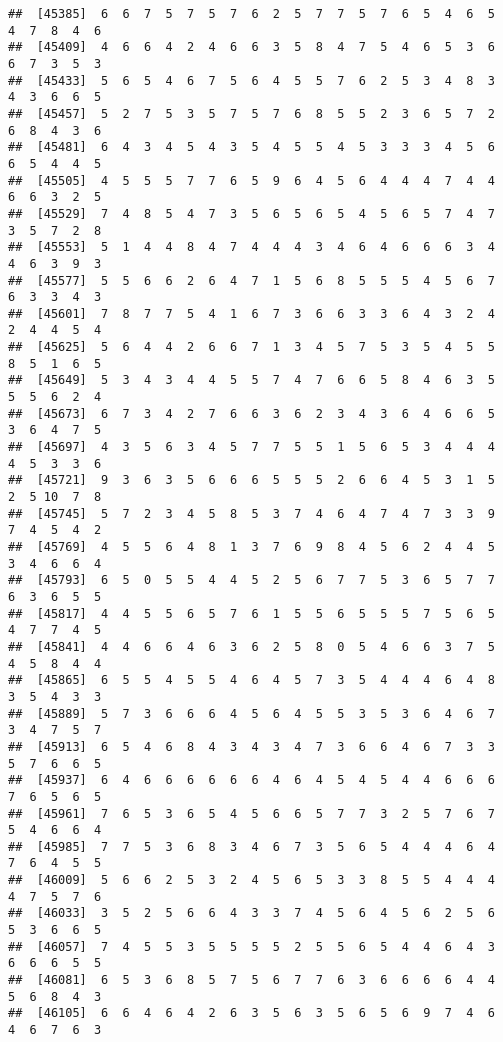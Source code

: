 \documentclass[
]{book}
\begin{document}
\begin{verbatim}
##  [45385]  6  6  7  5  7  5  7  6  2  5  7  7  5  7  6  5  4  6  5  4  7  8  4  6
##  [45409]  4  6  6  4  2  4  6  6  3  5  8  4  7  5  4  6  5  3  6  6  7  3  5  3
##  [45433]  5  6  5  4  6  7  5  6  4  5  5  7  6  2  5  3  4  8  3  4  3  6  6  5
##  [45457]  5  2  7  5  3  5  7  5  7  6  8  5  5  2  3  6  5  7  2  6  8  4  3  6
##  [45481]  6  4  3  4  5  4  3  5  4  5  5  4  5  3  3  3  4  5  6  6  5  4  4  5
##  [45505]  4  5  5  5  7  7  6  5  9  6  4  5  6  4  4  4  7  4  4  6  6  3  2  5
##  [45529]  7  4  8  5  4  7  3  5  6  5  6  5  4  5  6  5  7  4  7  3  5  7  2  8
##  [45553]  5  1  4  4  8  4  7  4  4  4  3  4  6  4  6  6  6  3  4  4  6  3  9  3
##  [45577]  5  5  6  6  2  6  4  7  1  5  6  8  5  5  5  4  5  6  7  6  3  3  4  3
##  [45601]  7  8  7  7  5  4  1  6  7  3  6  6  3  3  6  4  3  2  4  2  4  4  5  4
##  [45625]  5  6  4  4  2  6  6  7  1  3  4  5  7  5  3  5  4  5  5  8  5  1  6  5
##  [45649]  5  3  4  3  4  4  5  5  7  4  7  6  6  5  8  4  6  3  5  5  5  6  2  4
##  [45673]  6  7  3  4  2  7  6  6  3  6  2  3  4  3  6  4  6  6  5  3  6  4  7  5
##  [45697]  4  3  5  6  3  4  5  7  7  5  5  1  5  6  5  3  4  4  4  4  5  3  3  6
##  [45721]  9  3  6  3  5  6  6  6  5  5  5  2  6  6  4  5  3  1  5  2  5 10  7  8
##  [45745]  5  7  2  3  4  5  8  5  3  7  4  6  4  7  4  7  3  3  9  7  4  5  4  2
##  [45769]  4  5  5  6  4  8  1  3  7  6  9  8  4  5  6  2  4  4  5  3  4  6  6  4
##  [45793]  6  5  0  5  5  4  4  5  2  5  6  7  7  5  3  6  5  7  7  6  3  6  5  5
##  [45817]  4  4  5  5  6  5  7  6  1  5  5  6  5  5  5  7  5  6  5  4  7  7  4  5
##  [45841]  4  4  6  6  4  6  3  6  2  5  8  0  5  4  6  6  3  7  5  4  5  8  4  4
##  [45865]  6  5  5  4  5  5  4  6  4  5  7  3  5  4  4  4  6  4  8  3  5  4  3  3
##  [45889]  5  7  3  6  6  6  4  5  6  4  5  5  3  5  3  6  4  6  7  3  4  7  5  7
##  [45913]  6  5  4  6  8  4  3  4  3  4  7  3  6  6  4  6  7  3  3  5  7  6  6  5
##  [45937]  6  4  6  6  6  6  6  6  4  6  4  5  4  5  4  4  6  6  6  7  6  5  6  5
##  [45961]  7  6  5  3  6  5  4  5  6  6  5  7  7  3  2  5  7  6  7  5  4  6  6  4
##  [45985]  7  7  5  3  6  8  3  4  6  7  3  5  6  5  4  4  4  6  4  7  6  4  5  5
##  [46009]  5  6  6  2  5  3  2  4  5  6  5  3  3  8  5  5  4  4  4  4  7  5  7  6
##  [46033]  3  5  2  5  6  6  4  3  3  7  4  5  6  4  5  6  2  5  6  5  3  6  6  5
##  [46057]  7  4  5  5  3  5  5  5  5  2  5  5  6  5  4  4  6  4  3  6  6  6  5  5
##  [46081]  6  5  3  6  8  5  7  5  6  7  7  6  3  6  6  6  6  4  4  5  6  8  4  3
##  [46105]  6  6  4  6  4  2  6  3  5  6  3  5  6  5  6  9  7  4  6  4  6  7  6  3

\end{verbatim}
\end{document}

